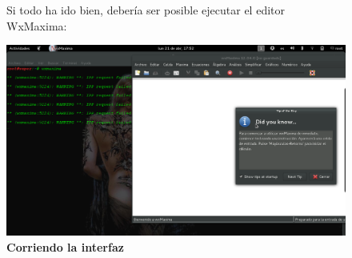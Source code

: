 \documentclass[10pt,a4paper]{book}
\begin{document}
\begin{small}
\begin{enumerate}
\begin{figure}[htb]
Si todo ha ido bien, debería ser posible ejecutar el editor WxMaxima:\\
\begin{center}
\includegraphics[width=13cm]{fotos/cap7}
\caption{\textbf{Corriendo la interfaz}}
\end{center}
\end{figure}
\end{enumerate}
\begin{figure}[htb]

\end{figure}
\end{small}
\end{document}
